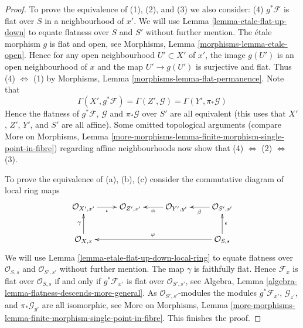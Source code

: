 \documentclass[10pt,a4paper]{amsart}
\theoremstyle{plain}
\theoremstyle{definition}
\theoremstyle{remark}
\numberwithin{equation}{subsection}
\begin{document}
\begin{proof}
To prove the equivalence of (1), (2), and (3) we also consider:
(4) $g^*\mathcal{F}$ is flat over $S$ in a neighbourhood of $x'$.
We will use
Lemma \ref{lemma-etale-flat-up-down}
to equate flatness over $S$ and $S'$ without further mention.
The \'etale morphism $g$ is flat and open, see
Morphisms, Lemma \ref{morphisms-lemma-etale-open}.
Hence for any open neighbourhood $U' \subset X'$ of $x'$, the image
$g(U')$ is an open neighbourhood of $x$ and the map
$U' \to g(U')$ is surjective and flat.
Thus (4) $\Leftrightarrow$ (1) by
Morphisms, Lemma \ref{morphisms-lemma-flat-permanence}.
Note that
$$
\Gamma(X', g^*\mathcal{F}) =
\Gamma(Z', \mathcal{G}) =
\Gamma(Y', \pi_*\mathcal{G})
$$
Hence the flatness of $g^*\mathcal{F}$, $\mathcal{G}$ and $\pi_*\mathcal{G}$
over $S'$ are all equivalent (this uses that $X'$, $Z'$, $Y'$, and
$S'$ are all affine). Some omitted topological arguments (compare
More on Morphisms,
Lemma \ref{more-morphisms-lemma-finite-morphism-single-point-in-fibre})
regarding affine neighbourhoods now show that
(4) $\Leftrightarrow$ (2) $\Leftrightarrow$ (3).

\medskip\noindent
To prove the equivalence of (a), (b), (c) consider the commutative diagram
of local ring maps
$$
\xymatrix{
\mathcal{O}_{X', x'} \ar[r]_\iota &
\mathcal{O}_{Z', z'} &
\mathcal{O}_{Y', y'} \ar[l]^\alpha &
\mathcal{O}_{S', s'} \ar[l]^\beta \\
\mathcal{O}_{X, x} \ar[u]^\gamma & & &
\mathcal{O}_{S, s} \ar[lll]_\varphi \ar[u]_\epsilon
}
$$
We will use
Lemma \ref{lemma-etale-flat-up-down-local-ring}
to equate flatness over $\mathcal{O}_{S, s}$ and $\mathcal{O}_{S', s'}$
without further mention.
The map $\gamma$ is faithfully flat. Hence
$\mathcal{F}_x$ is flat over $\mathcal{O}_{S, s}$
if and only if $g^*\mathcal{F}_{x'}$ is flat over
$\mathcal{O}_{S', s'}$, see
Algebra, Lemma \ref{algebra-lemma-flatness-descends-more-general}.
As $\mathcal{O}_{S', s'}$-modules the modules
$g^*\mathcal{F}_{x'}$, $\mathcal{G}_{z'}$, and
$\pi_*\mathcal{G}_{y'}$ are all isomorphic, see
More on Morphisms,
Lemma \ref{more-morphisms-lemma-finite-morphism-single-point-in-fibre}.
This finishes the proof.
\end{proof}
\end{document}
